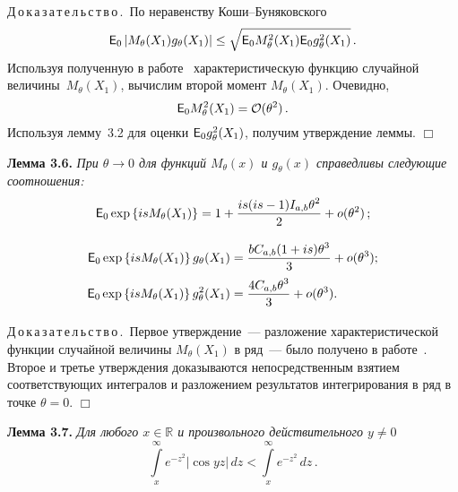 \begin{multicols}{2}
\medskip

\noindent
Д\,о\,к\,а\,з\,а\,т\,е\,л\,ь\,с\,т\,в\,о\,.\
По неравенству Коши--Бу\-ня\-ков\-ского
$$
{{\sf E}}_0 \left|M_{\theta}(X_1) g_{\theta}(X_1)\right| \leq 
\sqrt{{{\sf E}}_0 M_{\theta}^2(X_1)  {{\sf E}}_0 g_{\theta}^2(X_1)}\,.
$$
Используя полученную в работе~\cite{article} характеристическую функцию случайной величины~$M_{\theta}(X_1)$, 
вычислим второй момент $M_{\theta}(X_1)$. Очевидно,
$$
{{\sf E}}_0 M_{\theta}^2(X_1) = {\cal O}(\theta^2)\,.
$$
Используя лемму~3.2 для оценки ${{\sf E}}_0 g_{\theta}^2(X_1)$, получим утверждение леммы. \hfill $\Box$

\medskip


\noindent
\textbf{Лемма 3.6.}
\textit{При $\theta \to 0$ для функций $M_{\theta}(x)$ и $g_{\theta}(x)$ справедливы следующие соотношения:}
$$
{{\sf E}}_0 \exp\left\{isM_{\theta}(X_1)\right\} = 1 + \displaystyle\frac{\displaystyle is(is-1)I_{a,b} \theta^2\mathstrut}{\displaystyle 2\mathstrut} +  o(\theta^2)\,;
$$

\noindent
\begin{align*}
\hspace*{-0.2pt}{{\sf E}}_0 \exp\left\{isM_{\theta}(X_1)\right\} g_{\theta}(X_1) &= \displaystyle\frac{\displaystyle bC_{a,b}(1+is)\theta^3\mathstrut}{\displaystyle 3\mathstrut} +  o(\theta^3);
\\
\hspace*{-0.2pt}{{\sf E}}_0 \exp\left\{isM_{\theta}(X_1)\right\} g_{\theta}^2(X_1) &= \displaystyle\frac{\displaystyle 4C_{a,b} \theta^3\mathstrut}{\displaystyle 3\mathstrut} +  o(\theta^3).
\end{align*}

\medskip

\noindent
Д\,о\,к\,а\,з\,а\,т\,е\,л\,ь\,с\,т\,в\,о\,.\ 
Первое утверждение~--- разложение характеристической функции случайной величины $M_{\theta}(X_1)$ 
в ряд~--- было получено в работе~\cite{article}. Второе и третье утверждения доказываются 
непосредственным взятием соответствующих интегралов и разложением результатов интегрирования в ряд в 
точке $\theta=0$. \hfill $\Box$

\medskip

\noindent
\textbf{Лемма 3.7.}
\textit{Для любого $x\in{\mathbb{R}}$ и произвольного действительного $y\ne0$}
$$
\int\limits_x^{\infty} e^{-z^2}|\cos yz|\,dz < \int\limits_x^{\infty} e^{-z^2}\,dz\,.
$$


\medskip


\end{multicols}
